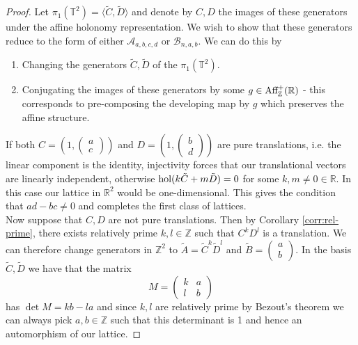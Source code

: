 \begin{proof}
    Let $\pi_1(\mathbb{T}^2) = \langle \tilde{C}, \tilde{D} \rangle$ and denote by $C,D$ the images of these generators under the affine holonomy representation.
    We wish to show that these generators reduce to the form of either $\mathcal{A}_{a,b,c,d}$ or $\mathcal{B}_{n,a,b}$. We can do this by
    \begin{enumerate}
        \item Changing the generators $\tilde{C}, \tilde{D}$ of the $\pi_1(\mathbb{T}^2)$.
        \item Conjugating the images of these generators by some $g \in \text{Aff}_{\mathbb{Z}}^+(\mathbb{R})$
              - this corresponds to pre-composing the developing map by $g$ which preserves
              the affine structure.
    \end{enumerate}
    If both $C= \left( 1 ,\begin{pmatrix}
                a \\ c
            \end{pmatrix}\right)$ and $D =\left(1, \begin{pmatrix}
                b \\ d
            \end{pmatrix}\right)$ are pure translations, i.e. the linear component is the identity, injectivity forces that
    our translational vectors are linearly independent, otherwise $\text{hol}(k\tilde{C} + m\tilde{D}) = 0$ for some $k,m\neq 0 \in \mathbb{R}$. In this
    case our lattice in $\mathbb{R}^2$ would be one-dimensional. This gives the condition that $ad-bc \neq 0$ and completes the first class of lattices. \\

    Now suppose that $C,D$ are not pure translations. Then by Corollary
    \ref{corr:rel-prime}, there exists relatively prime $k,l \in \mathbb{Z}$ such
    that $C^kD^l$ is a translation. We can therefore change generators in
    $\mathbb{Z}^2$ to $\tilde{A}=\tilde{C}^k\tilde{D}^l$ and $\tilde{B}= \begin{pmatrix}
            a \\ b
        \end{pmatrix}$. In the basis $\tilde{C}, \tilde{D}$ we have that the matrix
    $$M = \begin{pmatrix}
            k & a \\
            l & b
        \end{pmatrix}$$
    has $\det M = kb - la$ and since $k,l$ are relatively prime by Bezout's theorem we can always pick $a,b \in \mathbb{Z}$ such that
    this determinant is 1 and hence an automorphism of our lattice.


\end{proof}
